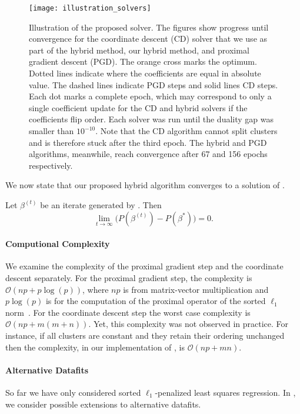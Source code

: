 \begin{figure*}[htb]
  \centering
  \texttt{[image: illustration\_solvers]}
  \caption{Illustration of the proposed solver. The figures show progress
    until convergence for the coordinate descent (CD) solver that we use as part
    of the hybrid method, our hybrid method, and  proximal gradient descent
    (PGD). The orange cross marks the optimum. Dotted lines indicate where the
    coefficients are equal in absolute value. The dashed lines indicate PGD
    steps and solid lines CD steps. Each dot marks a complete epoch, which may
    correspond to only a single coefficient update for the CD and hybrid
    solvers if the coefficients flip order. Each solver was run until the duality
    gap was smaller than \(10^{-10}\). Note that the CD algorithm cannot split clusters
    and is therefore stuck after the third epoch. The hybrid and PGD algorithms,
    meanwhile, reach convergence after 67 and 156 epochs respectively.}
  \label{fig:illustration-solver}
\end{figure*}

We now state that our proposed hybrid algorithm converges to a solution of .

\begin{lemma}
  \label{lem:convergence}
  Let \(\beta^{(t)}\) be an iterate generated by . Then
  \[
    \lim_{t \rightarrow \infty}\big(P(\beta^{(t)}) - P(\beta^*)\big) = 0.
  \]
\end{lemma}

\paragraph{Computional Complexity}
We examine the complexity of the proximal gradient step and the coordinate
descent separately. For the proximal gradient step, the complexity is $\mathcal{O}(np
+ p\log(p))$, where $np$ is from matrix-vector multiplication and $p\log(p)$ is
for the computation of the proximal operator of the sorted $\ell_1$ norm~\parencite{zeng2014ordered}.
For the coordinate descent step the worst case complexity is $\mathcal{O}(np + m(m + n))$.
Yet, this complexity was not observed in practice. For instance, if all clusters are
constant and they retain their ordering unchanged then the complexity, in our
implementation of , is $\mathcal{O}(np + mn)$.


\paragraph{Alternative Datafits}
So far we have only considered sorted \(\ell_1\)-penalized least squares regression.
In , we consider possible extensions to alternative datafits.

